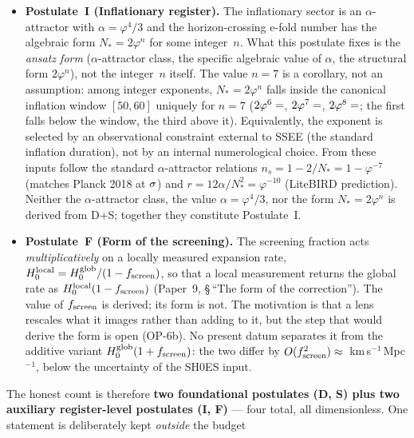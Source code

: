 \documentclass[12pt,a4paper]{article}
\begin{document}
\begin{itemize}
  \item \textbf{Postulate~I (Inflationary register).} The inflationary
        sector is an $\alpha$-attractor with $\alpha=\varphi^4/3$ and the
        horizon-crossing e-fold number has the algebraic form
        $N_*=2\varphi^n$ for some integer~$n$. What this postulate fixes
        is the \emph{ansatz form} ($\alpha$-attractor class, the specific
        algebraic value of $\alpha$, the structural form $2\varphi^n$),
        not the integer~$n$ itself. The value $n=7$ is a corollary, not an
        assumption: among integer exponents, $N_*=2\varphi^n$ falls inside
        the canonical inflation window $[50,60]$ uniquely for $n=7$
        ($2\varphi^6=\val{dos_phi6_d6}$, $2\varphi^7=\val{dos_phi7_d6}$,
        $2\varphi^8=\val{dos_phi8_d6}$; the first falls below the window, the third
        above it).
        Equivalently, the exponent is selected by an observational
        constraint external to SSEE (the standard inflation duration),
        not by an internal numerological choice. From these inputs follow
        the standard $\alpha$-attractor relations
        $n_s=1-2/N_*=1-\varphi^{-7}$ (matches Planck 2018 at $\val{ns_planck_sig}\sigma$)
        and $r=12\alpha/N_*^2 = \varphi^{-10}$ (LiteBIRD prediction).
        Neither the $\alpha$-attractor class, the value $\alpha=\varphi^4/3$,
        nor the form $N_*=2\varphi^n$ is derived from D+S; together they
        constitute Postulate~I.
  \item \textbf{Postulate~F (Form of the screening).} The screening fraction
        acts \emph{multiplicatively} on a locally measured expansion rate,
        $H_0^{\rm local}=H_0^{\rm glob}/(1-f_{\rm screen})$, so that a local
        measurement returns the global rate as $H_0^{\rm local}(1-f_{\rm screen})$
        (Paper~9, \S\,``The form of the correction''). The value of
        $f_{\rm screen}$ is derived; its form is not. The motivation is that a
        lens rescales what it images rather than adding to it, but the step
        that would derive the form is open (OP-6b). No present datum separates
        it from the additive variant $H_0^{\rm glob}(1+f_{\rm screen})$: the two
        differ by $O(f_{\rm screen}^2)\approx\val{p9_add_dif}$~km\,s$^{-1}$\,Mpc$^{-1}$,
        below the uncertainty of the SH0ES input.
\end{itemize}
The honest count is therefore \textbf{two foundational postulates (D, S)
plus two auxiliary register-level postulates (I, F)} --- four total, all
dimensionless. One statement is deliberately kept \emph{outside} the budget
\end{document}
